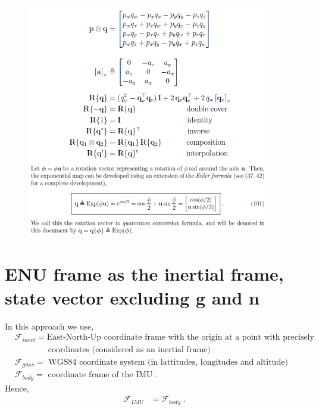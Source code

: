 \documentclass{article}
\begin{document}
\begin{figure}[htp]
    \centering
    \includegraphics[width=300pt]{quaternion-operations.png}
    \caption{}
    \label{fig-quaternion-operations}
\end{figure}








\newpage
\section{ENU frame as the inertial frame, state vector excluding \textbf{g} and \textbf{n}}

In this approach we use,
\begin{align}
    &\mathcal{F}_{inert}=\text{East-North-Up coordinate frame with the origin at a point with precisely known GNSS} \nonumber \\
    &\quad \quad \quad  \quad \text{coordinates (considered as an inertial frame)} \nonumber \\
    &\mathcal{F}_{gnss}=\text{ WGS84 coordinate system (in lattitudes, longitudes and altitude)} \nonumber \\
    &\mathcal{F}_{body}=\text{ coordinate frame of the IMU} \text{ .}
\end{align}{}
Hence,
\begin{align}
    \mathcal{F}_{IMU}&=\mathcal{F}_{body} \text{ .}
\end{align}{}
\end{document}
